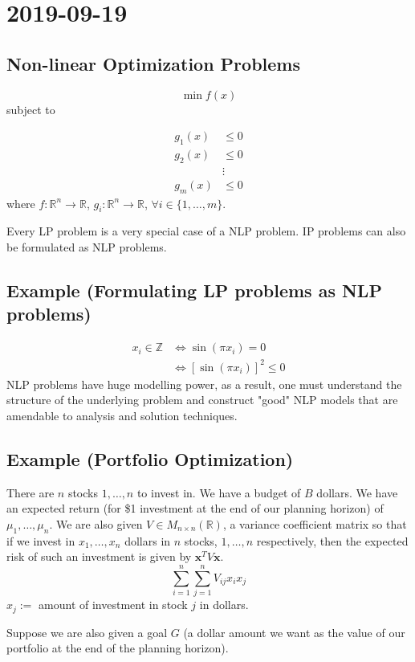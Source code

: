 \section{2019-09-19}
\subsection{Non-linear Optimization Problems}
\[\min f(x)\]
subject to

\begin{align*}
    g_1(x)&\le 0\\
    g_2(x)&\le 0\\
    &\vdots\\
    g_m(x)&\le 0
\end{align*}
where
$f:\mathbb{R}^n\rightarrow \mathbb{R}$, 
$g_i:\mathbb{R}^n\rightarrow\mathbb{R}$, $\forall i\in\{1,\dots,m\}$.

Every LP problem is a very special case of a NLP problem. IP problems can
also be formulated as NLP problems.
\subsection{Example (Formulating LP problems as NLP problems)}
\begin{align*}
    x_i\in\mathbb{Z}&\iff \sin(\pi x_i)=0\\
    &\iff [\sin(\pi x_i)]^2\le 0
\end{align*}
NLP problems have huge modelling power, as a result, one must understand the
structure of the underlying problem and construct "good" NLP models that are
amendable to analysis and solution techniques.

\subsection{Example (Portfolio Optimization)}
There are $n$ stocks $1,\dots,n$ to invest in. We have a budget of $B$ dollars.
We have an expected return (for \$1 investment at the end of our planning
horizon) of $\mu_1,\dots,\mu_n$. We are also given 
$V\in M_{n\times n}(\mathbb{R})$, a variance coefficient matrix so that if
we invest in $x_1,\dots,x_n$ dollars in $n$ stocks, $1,\dots,n$ respectively,
then the expected risk of such an investment is given by 
$\mathbf{x}^T V\mathbf{x}$.
\[\sum\limits_{i = 1}^{n}\sum\limits_{j = 1}^{n}V_{ij}x_ix_j\]
$x_j:=$ amount of investment in stock $j$ in dollars.

Suppose we are also given a goal $G$ (a dollar amount we want as the value
of our portfolio at the end of the planning horizon).

